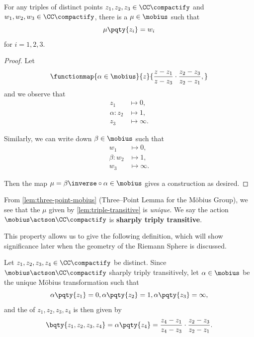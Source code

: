 \begin{lemma}
    \label{lem:triple-transitive}%
    For any triples of distinct points \(z_1, z_2, z_3 \in \CC\compactify\) and \(w_1, w_2, w_3 \in \CC\compactify\), there is a \(\mu \in \mobius\) such that
    \[
        \mu\pqty{z_i} = w_i
    \]
    for \(i = 1, 2, 3\).
\end{lemma}

\begin{proof}
    Let
    \[
        \functionmap{\alpha \in \mobius}{z}{\frac{z - z_1}{z - z_3} \cdot \frac{z_2 - z_3}{z_2 - z_1},}
    \]
    and we observe that
    \begin{align*}
        z_1 & \mapsto 0, \\
        \alpha: z_2 & \mapsto 1, \\
        z_3 & \mapsto \infty.
    \end{align*}

    Similarly, we can write down \(\beta \in \mobius\) such that
    \begin{align*}
        w_1 & \mapsto 0, \\
        \beta: w_2 & \mapsto 1, \\
        w_3 & \mapsto \infty.
    \end{align*}

    Then the map \(\mu = \beta\inverse \circ \alpha \in \mobius\) gives a construction as desired.
\end{proof}

From \autoref{lem:three-point-mobius} (Three--Point Lemma for the M\"{o}bius Group), we see that the \(\mu\) given by \autoref{lem:triple-transitive} is \emph{unique}. We say the action \(\mobius \actson \CC\compactify\) is \textbf{sharply triply transitive}.

This property allows us to give the following definition, which will show significance later when the geometry of the Riemann Sphere is discussed.

\begin{definition}
    \label{def:cross-ratio}%
    Let \(z_1, z_2, z_3, z_4 \in \CC\compactify\) be distinct. Since \(\mobius \actson \CC\compactify\) sharply triply transitively, let \(\alpha \in \mobius\) be the unique M\"{o}bius transformation such that
    \[
        \alpha\pqty{z_1} = 0, \alpha\pqty{z_2} = 1, \alpha\pqty{z_3} = \infty,
    \]
    and the  of \(z_1, z_2, z_3, z_4\) is then given by
    \[
        \bqty{z_1, z_2, z_3, z_4} = \alpha\pqty{z_4} = \frac{z_4 - z_1}{z_4 - z_3} \cdot \frac{z_2 - z_3}{z_2 - z_1}.
    \]
\end{definition}

